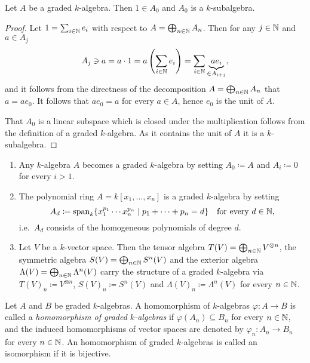 \begin{lem}
 Let $A$ be a graded $k$-algebra. Then $1 \in A_0$ and $A_0$ is a $k$-subalgebra.
\end{lem}
\begin{proof}
 Let $1 = \sum_{i \in \mathbb{N}} e_i$ with respect to $A = \bigoplus_{n \in \mathbb{N}} A_n$. Then for any $j \in \mathbb{N}$ and $a \in A_j$
 \[
  A_j \ni a
  = a \cdot 1
  = a \left( \sum_{i \in \mathbb{N}} e_i \right)
  = \sum_{i \in \mathbb{N}} \underbrace{a e_i}_{\in A_{i+j}},
 \]
 and it follows from the directness of the decomposition $A = \bigoplus_{n \in \mathbb{N}} A_n$ that $a = a e_0$. It follows that $a e_0 = a$ for every $a \in A$, hence $e_0$ is the unit of $A$.
 
 That $A_0$ is a linear subspace which is closed under the multiplication follows from the definition of a graded $k$-algebra. As it contains the unit of $A$ it is a $k$-subalgebra.
\end{proof}


\begin{expls}\label{expls: graded algebras}
 \begin{enumerate}[leftmargin=*]
  \item
   Any $k$-algebra $A$ becomes a graded $k$-algebra by setting $A_0 \coloneqq A$ and $A_i \coloneqq 0$ for every $i > 1$.
  \item
   The polynomial ring $A = k[x_1, \dotsc, x_n]$ is a graded $k$-algebra by setting
   \[
    A_d \coloneqq \operatorname{span}_k \{ x_1^{p_1} \dotsm x_n^{p_n} \mid p_1 + \dotsb + p_n = d\}
    \quad \text{for every $d \in \mathbb{N}$},
   \]
   i.e.\ $A_d$ consists of the homogeneous polynomials of degree $d$.
  \item
   Let $V$ be a $k$-vector space. Then the tensor algebra $T(V) = \bigoplus_{n \in \mathbb{N}} V^{\otimes n}$, the symmetric algebra $S(V) = \bigoplus_{n \in \mathbb{N}} S^n(V)$ and the exterior algebra $\Lambda(V) = \bigoplus_{n \in \mathbb{N}} \Lambda^n(V)$ carry the structure of a graded $k$-algebra via $T(V)_n \coloneqq V^{\otimes n}$, $S(V)_n \coloneqq S^n(V)$ and $\Lambda(V)_n \coloneqq \Lambda^n(V)$ for every $n \in \mathbb{N}$.
 \end{enumerate}
\end{expls}


\begin{defi}
 Let $A$ and $B$ be graded $k$-algebras. A homomorphism of $k$-algebras $\varphi \colon A \to B$ is called a \emph{homomorphism of graded $k$-algebras} if $\varphi(A_n) \subseteq B_n$ for every $n \in \mathbb{N}$, and the induced homomorphisms of vector spaces are denoted by $\varphi_n \colon A_n \to B_n$ for every $n \in \mathbb{N}$. An homomorphism of graded $k$-algebras is called an isomorphism if it is bijective.
\end{defi}


